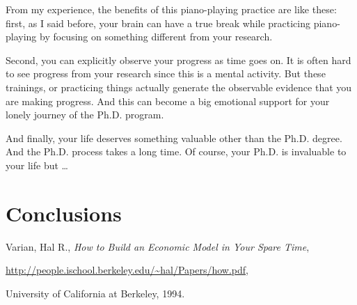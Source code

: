 \documentclass[11pt]{article}
\begin{document}
From my experience, the benefits of this piano-playing practice are like
these: first, as I said before, your brain can have a true break while
practicing piano-playing by focusing on something different from your
research.

Second, you can explicitly observe your progress as time goes on. It is often
hard to see progress from your research since this is a mental activity. But
these trainings, or practicing things actually generate the observable
evidence that you are making progress. And this can become a big emotional
support for your lonely journey of the Ph.D. program.

And finally, your life deserves something valuable other than the Ph.D.
degree. And the Ph.D. process takes a long time. Of course, your Ph.D.  is
invaluable to your life but \ldots


\section{Conclusions}




\begin{thebibliography}{99}
Varian, Hal R., \emph{How to Build an Economic Model in Your Spare Time},
\begin{small}\url{http://people.ischool.berkeley.edu/\~hal/Papers/how.pdf},\end{small}
University of California at Berkeley,
1994.


\end{thebibliography}
\end{document}
